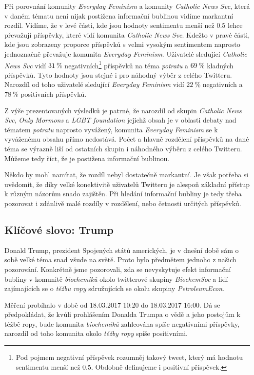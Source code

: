 \documentclass[12pt, a4paper]{article}
\numberwithin{equation}{section} 	%
\begin{document}
Při porovnání komunity \textit{Everyday Feminism} a komunity \textit{Catholic News Svc}, která v daném tématu není nijak postižena informační bublinou vidíme markantní rozdíl. Vidíme, že v levé části, kde jsou hodnoty sentimentu menší než $0.5$ lehce převažují příspěvky, které vidí komunita \textit{Catholic News Svc}. Kdežto v pravé části, kde jsou zobrazeny proporce příspěvků s velmi vysokým sentimentem naprosto jednoznačně převažuje komunita \textit{Everyday Feminism}. Uživatelé sledující \textit{Catholic News Svc} vidí $31~\%$ negativních\footnote{Pod pojmem negativní příspěvek rozumněj takový tweet, který má hodnotu sentimentu menší než $0.5$. Obdobně definujeme i positivní příspěvek.} příspěvků na téma \textit{potratu} a $69~\%$ kladných příspěvků. Tyto hodnoty jsou stejné i pro náhodný výběr z celého Twitteru. Narozdíl od toho uživatelé sledující \textit{Everyday Feminism} vidí $22~\%$ negativních a $78~\%$ positivních příspěvků.

Z výše prezentovaných výsledků je patrné, že narozdíl od skupin \textit{Catholic News Svc}, \textit{Only Mormons} a \textit{LGBT foundation} jejichž obsah je v oblasti debaty nad tématem \textit{potratu} naprosto vyvážený, komunita \textit{Everyday Feminism} se k vyváženému obsahu přímo nedostává. Počet a hlavně rozdělení příspěvků na dané téma se výrazně liší od ostatních skupin i náhodného výběru z celého Twitteru. Můžeme tedy říct, že je postižena informační bublinou.

Někdo by mohl namítat, že rozdíl nebyl dostatečně markantní. Je však potřeba si uvědomit, že díky velké konektivitě uživatelů Twitteru je alespoň základní přístup k různým názorům snado zajištěn. Při hledání informační bubliny je tedy třeba pozorovat i zdánlivě malé rozdíly v rozdělení, nebo četnosti určitých příspěvků.

\subsection{Klíčové slovo: Trump}
\noindent Donald Trump, prezident Spojených států amerických, je v dnešní době sám o sobě velké téma snad všude na světě. Proto bylo předmětem jednoho z našich pozorování. Konkrétně jsme pozorovali, zda se nevyskytuje efekt informační bubliny v komunitě \textit{biochemiků} okolo twitterové skupiny \textit{BiochemSoc} a lidí zajímajících se o \textit{těžbu ropy} sdružujících se okolu skupiny \textit{PetroleumEcon}.

Měření probíhalo v době od 18.03.2017 10:20 do 18.03.2017 16:00. Dá se předpokládat, že kvůli prohlášením Donalda Trumpa o vědě a jeho postojům k těžbě ropy, bude komunita \textit{biochemiků} zahlcována spíše negativními příspěvky, narozdíl od toho komunita okolo \textit{těžby ropy} spíše positivními.
\end{document}
